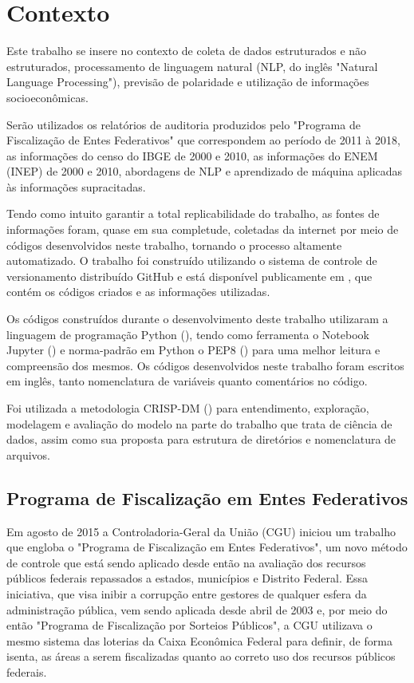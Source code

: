 \chapter{Contexto}
\label{cap:contexto}

Este trabalho se insere no contexto de coleta de dados estruturados e não estruturados, processamento de linguagem natural (NLP, do inglês "Natural Language Processing"), previsão de polaridade e utilização de informações socioeconômicas.

Serão utilizados os relatórios de auditoria produzidos pelo "Programa de Fiscalização de Entes Federativos" que correspondem ao período de 2011 à 2018, as informações do censo do IBGE de 2000 e 2010, as informações do ENEM (INEP) de 2000 e 2010, abordagens de NLP e aprendizado de máquina aplicadas às informações supracitadas.

Tendo como intuito garantir a total replicabilidade do trabalho, as fontes de informações foram, quase em sua completude, coletadas da internet por meio de códigos desenvolvidos neste trabalho, tornando o processo altamente automatizado. O trabalho foi construído utilizando o sistema de controle de versionamento distribuído GitHub e está disponível publicamente em \citet{GitHubLucas}, que contém os códigos criados e as informações utilizadas.

Os códigos construídos durante o desenvolvimento deste trabalho utilizaram a linguagem de programação Python (\citet{Python}), tendo como ferramenta o Notebook Jupyter (\citet{JupyterNotebook}) e norma-padrão em Python o PEP8 (\citet{PEP8}) para uma melhor leitura e compreensão dos mesmos. Os códigos desenvolvidos neste trabalho foram escritos em inglês, tanto nomenclatura de variáveis quanto comentários no código.

Foi utilizada a metodologia CRISP-DM (\citet{CRISPDM}) para entendimento, exploração, modelagem e avaliação do modelo na parte do trabalho que trata de ciência de dados, assim como sua proposta para estrutura de diretórios e nomenclatura de arquivos.

\section{Programa de Fiscalização em Entes Federativos}
\label{sec:programa_de_fiscalizacao_em_entes_federativos}

Em agosto de 2015 a Controladoria-Geral da União (CGU) iniciou um trabalho que engloba o "Programa de Fiscalização em Entes Federativos", um novo método de controle que está sendo aplicado desde então na avaliação dos recursos públicos federais repassados a estados, municípios e Distrito Federal. Essa iniciativa, que visa inibir a corrupção entre gestores de qualquer esfera da administração pública, vem sendo aplicada desde abril de 2003 e, por meio do então "Programa de Fiscalização por Sorteios Públicos", a CGU utilizava o mesmo sistema das loterias da Caixa Econômica Federal para definir, de forma isenta, as áreas a serem fiscalizadas quanto ao correto uso dos recursos públicos federais.

